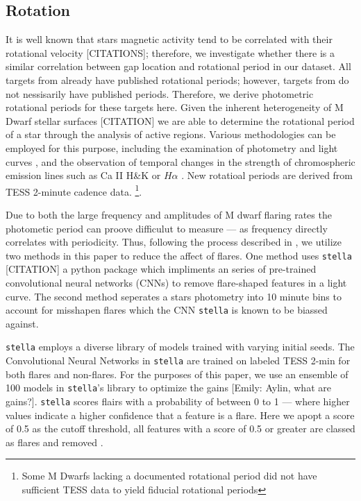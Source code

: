 \subsection{Rotation}
It is well known that stars magnetic activity tend to be correlated with their
rotational velocity {\color{red}[CITATIONS]}; therefore, we investigate whether
there is a similar correlation between gap location and rotational period in
our dataset. All targets from \citet{Boudreaux2022} already have published
rotational periods; however, targets from \citet{Perdelwitz2021} do not
nessisarily have published periods. Therefore, we derive photometric rotational
periods for these targets here. Given the inherent heterogeneity of M Dwarf
stellar surfaces {\color{red}[CITATION]} we are able to determine the
rotational period of a star through the analysis of active regions. Various
methodologies can be employed for this purpose, including the examination of
photometry and light curves \citep[e.g.,][]{Newton2016}, and the observation of
temporal changes in the strength of chromospheric emission lines such as Ca II
H\&K or $H\alpha$ \citep[e.g.,][]{2019A&A...623A..24F,2023MNRAS.518.3147K}. New
rotatioal periods are derived from TESS 2-minute cadence data. \footnote{Some M
Dwarfs lacking a documented rotational period did not have sufficient TESS data
to yield fiducial rotational periods}.

Due to both the large frequency and amplitudes of M dwarf flaring rates the
photometic period can proove difficulut to measure --- as frequency directly
correlates with periodicity. Thus, following the process described in
\citet{2023AJ....165..192G}, we utilize two methods in this paper to reduce the
affect of flares. One method uses \texttt{stella} {\color{red}[CITATION]} a
python package which impliments an series of pre-trained convolutional neural
networks (CNNs) to remove flare-shaped features in a light curve. The second
method seperates a stars photometry into 10 minute bins to account for
misshapen flares which the CNN \texttt{stella} is known to be biassed against.

\texttt{stella} \citep{FeinsteinFlare2020,FeinsteinStella2020} employs a
diverse library of models trained with varying initial seeds. The Convolutional
Neural Networks in \texttt{stella} are trained on labeled TESS 2-min for both
flares and non-flares. For the purposes of this paper, we use an ensemble of
100 models in \texttt{stella}'s library to optimize the gains
{\color{green}[Emily: Aylin, what are gains?]}. \texttt{stella} scores flairs
with a probability of between 0 to 1 --- where higher values indicate a higher
confidence that a feature is a flare. Here we apopt a score of 0.5 as the
cutoff threshold, all features with a score of 0.5 or greater are classed as
flares and removed \citep[e.g.][]{FeinsteinFlare2020}.

